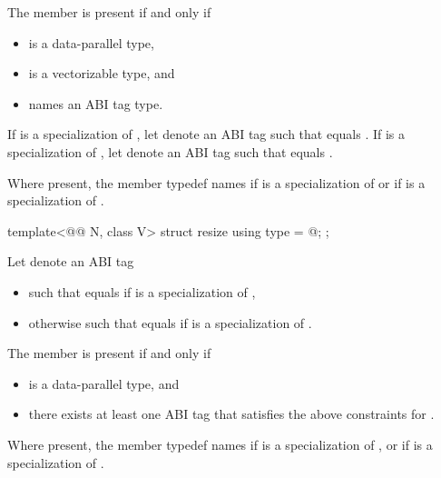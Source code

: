 \begin{itemdescr}
\pnum
The member  is present if and only if
\begin{itemize}
\item {} is a data-parallel type,
\item {} is a vectorizable type, and
\item {} names an ABI tag type.
\end{itemize}

\pnum
If  is a specialization of , let  denote
an ABI tag such that  equals
.
If  is a specialization of , let 
denote an ABI tag such that  equals .

\pnum
Where present, the member typedef  names 
if  is a specialization of  or
 if  is a specialization of
.
\end{itemdescr}

\begin{itemdecl}
template<@@ N, class V> struct resize { using type = @\seebelow@; };
\end{itemdecl}

\begin{itemdescr}
\pnum
Let  denote an ABI tag
\begin{itemize}
 \item
   such that 
   equals  if  is a specialization of ,
 \item
   otherwise such that
   equals  if  is a specialization of .
\end{itemize}

\pnum
The member  is present if and only if
\begin{itemize}
\item
   is a data-parallel type, and
\item
  there exists at least one ABI tag
  that satisfies the above constraints for .
\end{itemize}

\pnum
Where present, the member typedef  names
if  is a specialization of , or
if  is a specialization of .
\end{itemdescr}

